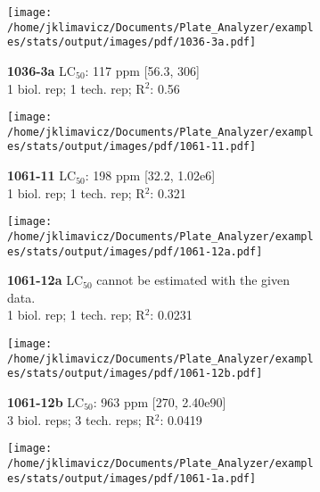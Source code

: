 \documentclass{article}
\begin{document}
\begin{figure}[thp!]
   \begin{subfigure}{0.500\textwidth}
      \centering
      \texttt{[image: /home/jklimavicz/Documents/Plate\_Analyzer/examples/stats/output/images/pdf/1036-3a.pdf]}
      \vspace{-0.05cm}
      \caption*{\textbf{1036-3a} LC$_{50}$: 117 ppm [56.3, 306] \\ 
1 biol. rep; 1 tech. rep; R$^2$: 0.56}
      \vspace{0.1cm}
   \end{subfigure}%
   \begin{subfigure}{0.500\textwidth}
      \centering
      \texttt{[image: /home/jklimavicz/Documents/Plate\_Analyzer/examples/stats/output/images/pdf/1061-11.pdf]}
      \vspace{-0.05cm}
      \caption*{\textbf{1061-11} LC$_{50}$: 198 ppm [32.2, 1.02e6] \\ 
1 biol. rep; 1 tech. rep; R$^2$: 0.321}
      \vspace{0.1cm}
   \end{subfigure}%
\vspace{-0.1cm}
   \begin{subfigure}{0.500\textwidth}
      \centering
      \texttt{[image: /home/jklimavicz/Documents/Plate\_Analyzer/examples/stats/output/images/pdf/1061-12a.pdf]}
      \vspace{-0.05cm}
      \caption*{\textbf{1061-12a} LC$_{50}$ cannot be estimated with the given data. \\ 
1 biol. rep; 1 tech. rep; R$^2$: 0.0231}
      \vspace{0.1cm}
   \end{subfigure}%
   \begin{subfigure}{0.500\textwidth}
      \centering
      \texttt{[image: /home/jklimavicz/Documents/Plate\_Analyzer/examples/stats/output/images/pdf/1061-12b.pdf]}
      \vspace{-0.05cm}
      \caption*{\textbf{1061-12b} LC$_{50}$: 963 ppm [270, 2.40e90] \\ 
3 biol. reps; 3 tech. reps; R$^2$: 0.0419}
      \vspace{0.1cm}
   \end{subfigure}%
\vspace{-0.1cm}
   \begin{subfigure}{0.500\textwidth}
      \centering
      \texttt{[image: /home/jklimavicz/Documents/Plate\_Analyzer/examples/stats/output/images/pdf/1061-1a.pdf]}

\end{subfigure}
\end{figure}
\end{document}
